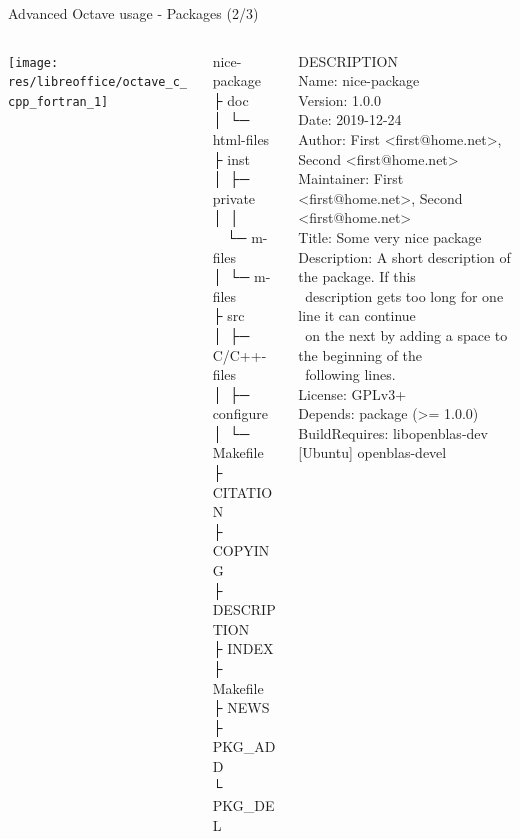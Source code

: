 \begin{frame}{Advanced Octave usage - Packages (2/3)}
\begin{columns}
\begin{column}[t]{0.2\textwidth}
\texttt{[image: res/libreoffice/octave\_c\_cpp\_fortran\_1]}
\end{column}
\begin{column}{0.2\textwidth}
\ttfamily\scriptsize
\colorbox{green!30}{nice-package} \\
├ \colorbox{orange!30}{doc} \\
│ └─ html-files \\
├ \colorbox{orange!30}{inst} \\
│ ├─ \colorbox{orange!30}{private} \\
│ │ \ \ └─ m-files \\
│ └─ m-files \\
├ \colorbox{orange!30}{src} \\
│ ├─ C/C++-files \\
│ ├─ configure \\
│ └─ Makefile \\
├ CITATION \\
├ {\color{red!50!black}COPYING}  \\
├ {\color{red!50!black}DESCRIPTION} \\
├ INDEX    \\
├ Makefile \\
├ NEWS     \\
├ PKG\_ADD \\
└ PKG\_DEL \\
\end{column}
\begin{column}{0.5\textwidth}
\ttfamily\tiny
\colorbox{red!30}{DESCRIPTION} \\[0.5em]
Name: nice-package \\
Version: 1.0.0 \\
Date: 2019-12-24 \\
Author: First <first@home.net>, Second <first@home.net> \\
Maintainer: First <first@home.net>, Second <first@home.net> \\
Title: Some very nice package \\
Description: A short description of the package.  If this \\
\ description gets too long for one line it can continue \\
\ on the next by adding a space to the beginning of the \\
\ following lines. \\
License: GPLv3+ \\
{\color{red!50!black}Depends: package (>= 1.0.0)} \\
BuildRequires: libopenblas-dev [Ubuntu] openblas-devel \\[2em]


\end{column}
\end{columns}
\end{frame}

